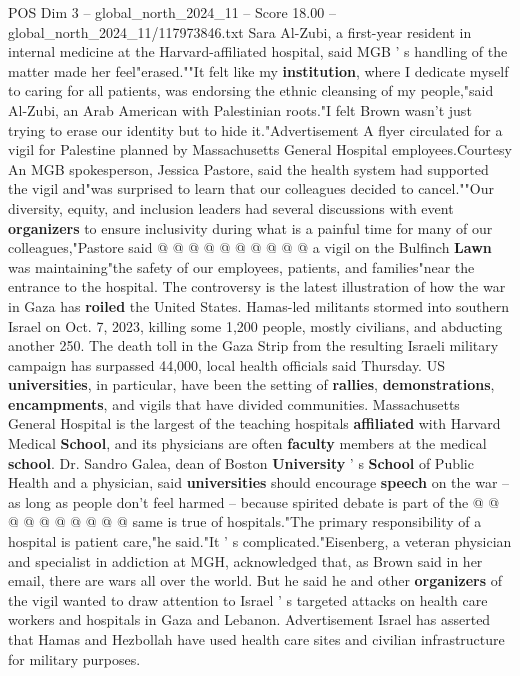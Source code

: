 \begin{textsample}{POS Dim 3 – global\_north\_2024\_11 – Score 18.00 – global\_north\_2024\_11/117973846.txt}
Sara Al-Zubi, a first-year resident in internal medicine at the Harvard-affiliated hospital, said MGB ' s handling of the matter made her feel"erased.""It felt like my \textbf{institution}, where I dedicate myself to caring for all patients, was endorsing the ethnic cleansing of my people,"said Al-Zubi, an Arab American with Palestinian roots."I felt Brown wasn't just trying to erase our identity but to hide it."Advertisement A flyer circulated for a vigil for Palestine planned by Massachusetts General Hospital employees.Courtesy An MGB spokesperson, Jessica Pastore, said the health system had supported the vigil and"was surprised to learn that our colleagues decided to cancel.""Our diversity, equity, and inclusion leaders had several discussions with event \textbf{organizers} to ensure inclusivity during what is a painful time for many of our colleagues,"Pastore said @ @ @ @ @ @ @ @ @ @ a vigil on the Bulfinch \textbf{Lawn} was maintaining"the safety of our employees, patients, and families"near the entrance to the hospital.
The controversy is the latest illustration of how the war in Gaza has \textbf{roiled} the United States.
Hamas-led militants stormed into southern Israel on Oct. 7, 2023, killing some 1,200 people, mostly civilians, and abducting another 250.
The death toll in the Gaza Strip from the resulting Israeli military campaign has surpassed 44,000, local health officials said Thursday.
US \textbf{universities}, in particular, have been the setting of \textbf{rallies}, \textbf{demonstrations}, \textbf{encampments}, and vigils that have divided communities.
Massachusetts General Hospital is the largest of the teaching hospitals \textbf{affiliated} with Harvard Medical \textbf{School}, and its physicians are often \textbf{faculty} members at the medical \textbf{school}.
Dr.
Sandro Galea, dean of Boston \textbf{University} ' s \textbf{School} of Public Health and a physician, said \textbf{universities} should encourage \textbf{speech} on the war -- as long as people don't feel harmed -- because spirited debate is part of the @ @ @ @ @ @ @ @ @ @ same is true of hospitals."The primary responsibility of a hospital is patient care,"he said."It ' s complicated."Eisenberg, a veteran physician and specialist in addiction at MGH, acknowledged that, as Brown said in her email, there are wars all over the world.
But he said he and other \textbf{organizers} of the vigil wanted to draw attention to Israel ' s targeted attacks on health care workers and hospitals in Gaza and Lebanon.
Advertisement Israel has asserted that Hamas and Hezbollah have used health care sites and civilian infrastructure for military purposes.

\end{textsample}
